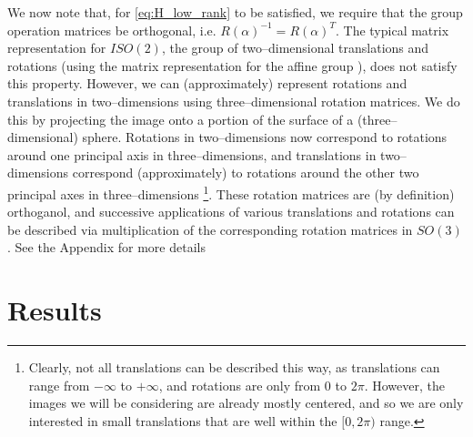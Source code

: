 \documentclass[11pt]{article}
\begin{document}
We now note that, for \eqref{eq:H_low_rank} to be satisfied, we require that the group operation matrices be orthogonal, i.e. $R(\alpha)^{-1} = R(\alpha)^T$. 
%
The typical matrix representation for $ISO(2)$, the group of two--dimensional translations and rotations (using the matrix representation for the affine group \cite{...}), does not satisfy this property. 
%
However, we can (approximately) represent rotations and translations in two--dimensions using three--dimensional rotation matrices.
%
We do this by projecting the image onto a portion of the surface of a (three--dimensional) sphere.
%
Rotations in two--dimensions now correspond to rotations around one principal axis in three--dimensions, and translations in two--dimensions correspond (approximately) to rotations around the other two principal axes in three--dimensions \footnote{Clearly, not all translations can be described this way, as translations can range from $-\infty$ to $+ \infty$, and rotations are only from $0$ to $2 \pi$. However, the images we will be considering are already mostly centered, and so we are only interested in small translations that are well within the $[0, 2\pi)$ range.}.
%
These rotation matrices are (by definition) orthoganol, and successive applications of various translations and rotations can be described via multiplication of the corresponding rotation matrices in $SO(3)$.
%
See the Appendix for more details




\section{Results}
\end{document}

